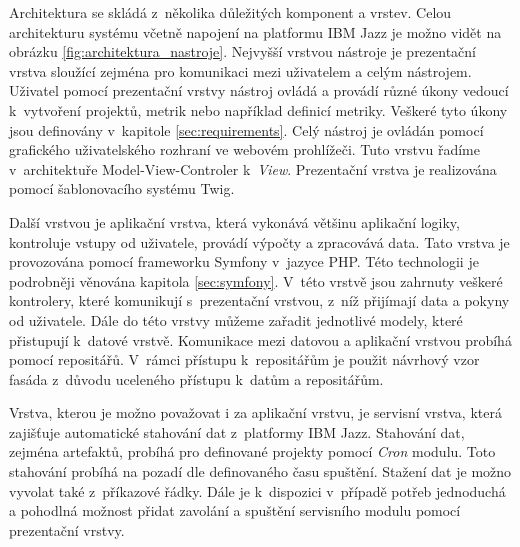 \documentclass[czech,master]{diploma}
\begin{document}
Architektura se skládá z~několika důležitých komponent a vrstev. Celou architekturu systému včetně napojení na platformu IBM Jazz je možno vidět na obrázku \ref{fig:architektura_nastroje}. Nejvyšší vrstvou nástroje je prezentační vrstva sloužící zejména pro komunikaci mezi uživatelem a celým nástrojem. Uživatel pomocí prezentační vrstvy nástroj ovládá a provádí různé úkony vedoucí k~vytvoření projektů, metrik nebo například definicí metriky. Veškeré tyto úkony jsou definovány v~kapitole \ref{sec:requirements}. Celý nástroj je ovládán pomocí grafického uživatelského rozhraní ve webovém prohlížeči. Tuto vrstvu řadíme v~architektuře Model-View-Controler k~\textit{View}. Prezentační vrstva je realizována pomocí šablonovacího systému Twig.

Další vrstvou je aplikační vrstva, která vykonává většinu aplikační logiky, kontroluje vstupy od uživatele, provádí výpočty a zpracovává data. Tato vrstva je provozována pomocí frameworku Symfony v~jazyce PHP. Této technologii je podrobněji věnována kapitola \ref{sec:symfony}. V~této vrstvě jsou zahrnuty veškeré kontrolery, které komunikují s~prezentační vrstvou, z~níž přijímají data a pokyny od uživatele. Dále do této vrstvy můžeme zařadit jednotlivé modely, které přistupují k~datové vrstvě. Komunikace mezi datovou a aplikační vrstvou probíhá pomocí repositářů. V~rámci přístupu k~repositářům je použit návrhový vzor fasáda z~důvodu uceleného přístupu k~datům a repositářům.

Vrstva, kterou je možno považovat i za aplikační vrstvu, je servisní vrstva, která zajišťuje automatické stahování dat z~platformy IBM Jazz. Stahování dat, zejména artefaktů, probíhá pro definované projekty pomocí \textit{Cron} modulu. Toto stahování probíhá na pozadí dle definovaného času spuštění. Stažení dat je možno vyvolat také z~příkazové řádky. Dále je k~dispozici v~případě potřeb jednoduchá a pohodlná možnost přidat zavolání a spuštění servisního modulu pomocí prezentační vrstvy.
\end{document}
